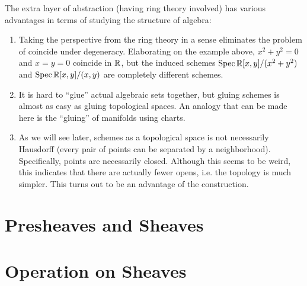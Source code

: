\documentclass{article}
\begin{document}
\begin{remark}
    The extra layer of abstraction (having ring theory involved) has various advantages in terms of studying the structure of algebra:
    \begin{enumerate}
        \item Taking the perspective from the ring theory in a sense eliminates the problem of coincide under degeneracy. Elaborating on the example above, $x^2 + y^2 = 0$ and $x = y = 0$ coincide in $\mathbb{R}$, but the induced schemes $\operatorname{Spec} \mathbb{R}[x, y]/(x^2 + y^2)$ and $\operatorname{Spec} \mathbb{R}[x, y]/(x, y)$ are completely different schemes.
        \item It is hard to ``glue'' actual algebraic sets together, but gluing schemes is almost as easy as gluing topological spaces. An analogy that can be made here is the ``gluing'' of manifolds using charts.
        \item As we will see later, schemes as a topological space is not necessarily Hausdorff (every pair of points can be separated by a neighborhood). Specifically, points are necessarily closed. Although this seems to be weird, this indicates that there are actually fewer opens, i.e. the topology is much simpler. This turns out to be an advantage of the construction.
    \end{enumerate}
\end{remark}

\section{Presheaves and Sheaves}

\section{Operation on Sheaves}
\end{document}
